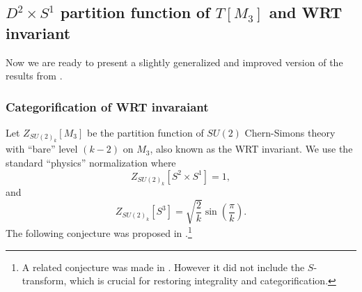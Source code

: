 \documentclass[hyper,letterpaper]{JHEP3}
\newcommand{\be}{\begin{equation}}
\newcommand{\ee}{\end{equation}}
\begin{document}
\subsection{${D^2\times S^1}$ partition function of ${T[M_3]}$ and WRT invariant}
\label{sec:summaryConj}

Now we are ready to present a slightly generalized and improved version of the results from \cite[sec.~6]{Gukov:2016gkn}.

\subsubsection*{Categorification of WRT invaraiant}

Let $Z_{SU(2)_k}[M_3]$ be the partition function of $SU(2)$ Chern-Simons theory
with ``bare'' level $(k-2)$ on $M_3$, also known as the WRT invariant.
We use the standard ``physics'' normalization where
\be
Z_{SU(2)_k}\left[S^2\times S^1\right]=1,
\ee
and
\be
Z_{SU(2)_k}\left[S^3\right]=\sqrt{\frac2k}\sin\left(\frac\pi k\right).
\ee
The following conjecture was proposed in \cite{Gukov:2016gkn}.\footnote{A related conjecture was made in \cite{hikami2011decomposition}. However it did not include the $S$-transform, which is crucial for restoring integrality and categorification.}
\end{document}
